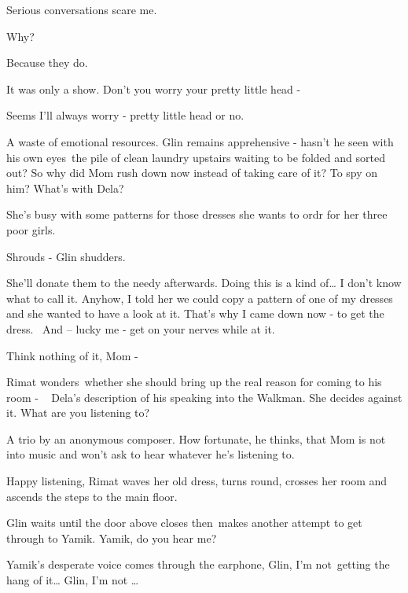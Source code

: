 \documentclass[letterpaper]{article}
\begin{document}
{\textquotedbl}Serious conversations scare me.{\textquotedbl} 

{\textquotedbl}Why?{\textquotedbl} 

{\textquotedbl}Because they do.{\textquotedbl} 

{\textquotedbl}It was only a show. Don't you worry your pretty little head -{\textquotedbl}

{\textquotedbl}Seems I'll always worry - pretty little head or no.{\textquotedbl} 

{\textquotedbl}A waste of emotional resources.{\textquotedbl} Glin remains apprehensive - hasn't he seen with his own
eyes~the pile of clean laundry upstairs waiting to be folded and sorted out? So why did Mom rush down now instead of
taking care of it? To spy on him? {\textquotedbl}What's with Dela?{\textquotedbl}~ 

{\textquotedbl}She's busy with some patterns for those dresses she wants to ordr for her three poor
girls.{\textquotedbl} 

{\textquotedbl}Shrouds - {\textquotedbl} Glin shudders. 

{\textquotedbl}She'll donate them to the needy afterwards. Doing this is a kind of{\dots} I don't know what to call it.
Anyhow, I told her we could copy a pattern of one of my dresses and she wanted to have a look at it. That's why I came
down now - to get the dress. ~And -- lucky me - get on your nerves while at it.{\textquotedbl} 

{\textquotedbl}Think nothing of it, Mom -{\textquotedbl} 

Rimat wonders~whether she should bring up the real reason for coming to his room - ~ Dela's description of his speaking
into the Walkman. She decides against it. {\textquotedbl}What are you listening to?{\textquotedbl} 

{\textquotedbl}A trio by an anonymous composer.{\textquotedbl} How fortunate, he thinks, that Mom is not into music and
won't ask to hear whatever he's listening to. 

{\textquotedbl}Happy listening,{\textquotedbl} Rimat waves her old dress, turns round, crosses her room and ascends the
steps to the main floor.

Glin waits until the door above closes then~makes another attempt to get through to Yamik. {\textquotedbl}Yamik, do you
hear me?{\textquotedbl} 

Yamik's desperate voice comes through the earphone, {\textquotedbl}Glin, I'm not~getting the hang of it{\dots} Glin, I'm
not {\dots}{\textquotedbl} 
\end{document}

